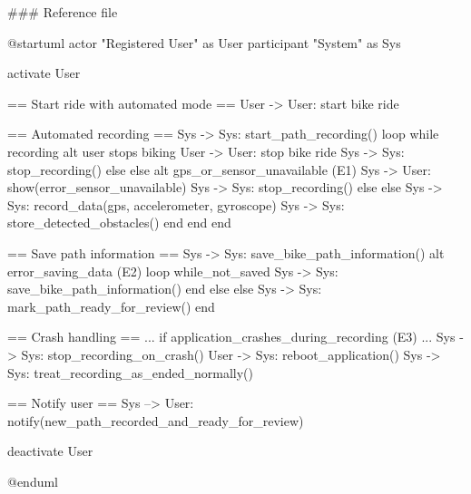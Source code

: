 ### Reference file

@startuml
actor "Registered User" as User
participant "System" as Sys

activate User

== Start ride with automated mode ==
User -> User: start bike ride

== Automated recording ==
Sys -> Sys: start_path_recording()
loop while recording
   alt user stops biking
       User -> User: stop bike ride
       Sys -> Sys: stop_recording()
   else else
      alt gps_or_sensor_unavailable (E1)
         Sys -> User: show(error_sensor_unavailable)
         Sys -> Sys: stop_recording()
      else else
         Sys -> Sys: record_data(gps, accelerometer, gyroscope)
         Sys -> Sys: store_detected_obstacles()
      end
   end
end


== Save path information ==
Sys -> Sys: save_bike_path_information()
alt error_saving_data (E2)
    loop while_not_saved
       Sys -> Sys: save_bike_path_information()
    end
else else
    Sys -> Sys: mark_path_ready_for_review()
end

== Crash handling ==
... if application_crashes_during_recording (E3) ...
Sys -> Sys: stop_recording_on_crash()
User -> Sys: reboot_application()
Sys -> Sys: treat_recording_as_ended_normally()

== Notify user ==
Sys --> User: notify(new_path_recorded_and_ready_for_review)

deactivate User

@enduml
